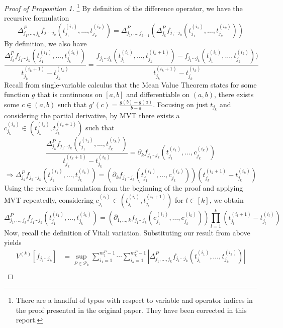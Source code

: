 \documentclass{article}
\begin{document}
\begin{proof}[Proof of Proposition 1]{\color{red}\footnote{There are a handful of typos with respect to variable and operator indices in the proof presented in the original paper. They have been corrected in this report.}}
    By definition of the difference operator, we have the recursive formulation
    \[\Delta^{P}_{j_1, \ldots, j_k} f_{j_1 \cdots j_k} (t^{(i_1)}_{j_1}, \ldots, t^{(i_k)}_{j_k}) = \Delta^{P}_{j_1, \ldots, j_{k-1}} \left( \Delta^{P}_{j_k} f_{j_1 \cdots j_k} (t^{(i_1)}_{j_1}, \ldots, t^{(i_k)}_{j_k}) \right)\]
    By definition, we also have
    \[\frac{\Delta^{P}_{j_k} f_{j_1 \cdots j_k} (t^{(i_1)}_{j_1}, \ldots, t^{(i_k)}_{j_k})}{t^{(i_k + 1)}_{j_k} - t^{(i_k)}_{j_k}} = \frac{f_{j_1 \cdots j_k} (t^{(i_1)}_{j_1}, \ldots, t^{(i_k + 1)}_{j_k}) - f_{j_1 \cdots j_k} (t^{(i_1)}_{j_1}, \ldots, t^{(i_k)}_{j_k}))}{t^{(i_k + 1)}_{j_k} - t^{(i_k)}_{j_k}}\]
    Recall from single-variable calculus that the Mean Value Theorem states for some function $g$ that is continuous on $[a, b]$ and differentiable on $(a, b)$, there exists some $c \in (a, b)$ such that $g'(c) = \frac{g(b) - g(a)}{b - a}$. Focusing on just $t_{j_k}$ and considering the partial derivative, by MVT there exists a $c_{j_k}^{(i_k)} \in (t^{(i_k)}_{j_k}, t^{(i_k + 1)}_{j_k})$ such that
    \[\frac{\Delta^{P}_{j_k} f_{j_1 \cdots j_k} (t^{(i_1)}_{j_1}, \ldots, t^{(i_k)}_{j_k})}{t^{(i_k + 1)}_{j_k} - t^{(i_k)}_{j_k}} = \partial_k f_{j_1 \cdots j_k} (t^{(i_1)}_{j_1}, \ldots, c^{(i_k)}_{j_k})\]
    \[\Longrightarrow \Delta^{P}_{j_k} f_{j_1 \cdots j_k} (t^{(i_1)}_{j_1}, \ldots, t^{(i_k)}_{j_k}) = \left( \partial_k f_{j_1 \cdots j_k} (t^{(i_1)}_{j_1}, \ldots, c^{(i_k)}_{j_k}) \right) (t^{(i_k + 1)}_{j_k} - t^{(i_k)}_{j_k})\]
    Using the recursive formulation from the beginning of the proof and applying MVT repeatedly, considering $c_{j_l}^{(i_l)} \in (t^{(i_l)}_{j_l}, t^{(i_l + 1)}_{j_l})$ for $l \in [k]$, we obtain
    \[\Delta^{P}_{j_1, \ldots, j_k} f_{j_1 \cdots j_k} (t^{(i_1)}_{j_1}, \ldots, t^{(i_k)}_{j_k}) = \left( \partial_{1, \ldots, k} f_{j_1 \cdots j_k} (c^{(i_1)}_{j_1}, \ldots, c^{(i_k)}_{j_k}) \right) \prod_{l=1}^{k} (t^{(i_l + 1)}_{j_l} - t^{(i_l)}_{j_l})\]
    Now, recall the definition of Vitali variation. Substituting our result from above yields
    \begin{align*}
        V^{(k)} [f_{j_1 \cdots j_k}] & = \sup_{P \in \mathcal{P}_k} \sum_{i_1 = 1}^{m^{P}_{1} - 1} \cdots \sum_{i_k = 1}^{m^{P}_{k} - 1} \left| \Delta^{P}_{j_1, \ldots, j_k} f_{j_1 \cdots j_k} (t^{(i_1)}_{j_1}, \ldots, t^{(i_k)}_{j_k}) \right| \\

\end{align*}
\end{proof}
\end{document}
